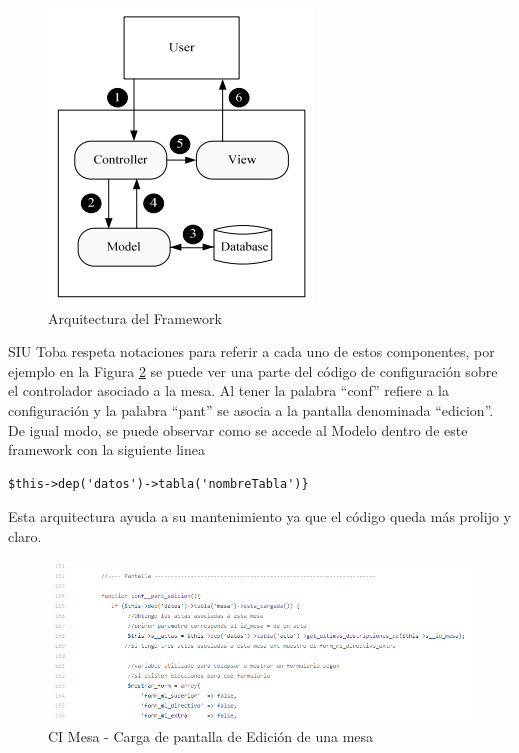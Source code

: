\begin{figure}[h!]
    \begin{center}
        \includegraphics{img/mvc_arq.png}
    \end{center}
  \caption{Arquitectura del Framework}
  \label{graf:mvcArquitectura}
\end{figure}

SIU Toba respeta notaciones para referir a cada uno de estos componentes, por ejemplo en la Figura \ref{graf:ejemploPantalla} se puede ver una parte del código de configuración sobre el controlador asociado a la mesa. Al tener la palabra ``conf'' refiere a la configuración y la palabra ``pant'' se asocia a la pantalla denominada ``edicion''. De igual modo, se puede observar como se accede al Modelo dentro de este framework con la siguiente linea
\begin{lstlisting}
$this->dep('datos')->tabla('nombreTabla')}
\end{lstlisting}
Esta arquitectura ayuda a su mantenimiento ya que el código queda más prolijo y claro.

\begin{figure}[h!]
    \begin{center}
        \includegraphics[width=\textwidth]{img/ejemplo_pantalla.png}
    \end{center}
  \caption{CI Mesa - Carga de pantalla de Edición de una mesa}
  \label{graf:ejemploPantalla}
\end{figure}

